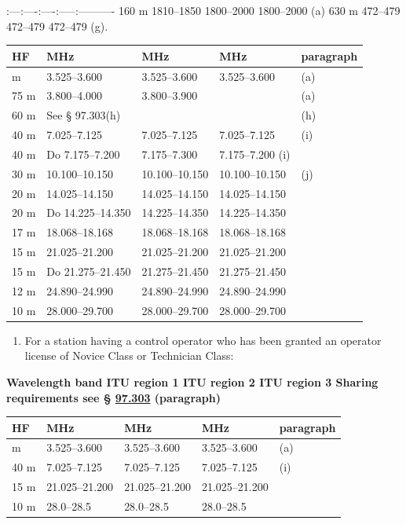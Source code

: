 \documentclass[
  letterpaper,
  DIV=11,
  numbers=noendperiod]{scrreport}
\providecommand{\tightlist}{%
  \setlength{\itemsep}{0pt}\setlength{\parskip}{0pt}}\usepackage{longtable,booktabs,array}
\begin{document}
\textbar:---\textbar:----\textbar:----:-----\textbar:----------\textbar{}
\textbar{} 160 m \textbar{} 1810--1850 \textbar{} 1800--2000 \textbar{}
1800--2000 \textbar{} (a) \textbar{} \textbar{} 630 m \textbar{}
472--479 \textbar{} 472--479 \textbar{} 472--479 \textbar{} (g).
\textbar{}

\begin{longtable}[]{@{}lllll@{}}
\toprule\noalign{}
HF & MHz & MHz & MHz & paragraph \\
\midrule\noalign{}
\endhead
\bottomrule\noalign{}
\endlastfoot
80 m & 3.525--3.600 & 3.525--3.600 & 3.525--3.600 & (a) \\
75 m & 3.800--4.000 & 3.800--3.900 & & (a) \\
60 m & See § 97.303(h) & & & (h) \\
40 m & 7.025--7.125 & 7.025--7.125 & 7.025--7.125 & (i) \\
40 m & Do 7.175--7.200 & 7.175--7.300 & 7.175--7.200 (i) & \\
30 m & 10.100--10.150 & 10.100--10.150 & 10.100--10.150 & (j) \\
20 m & 14.025--14.150 & 14.025--14.150 & 14.025--14.150 & \\
20 m & Do 14.225--14.350 & 14.225--14.350 & 14.225--14.350 & \\
17 m & 18.068--18.168 & 18.068--18.168 & 18.068--18.168 & \\
15 m & 21.025--21.200 & 21.025--21.200 & 21.025--21.200 & \\
15 m & Do 21.275--21.450 & 21.275--21.450 & 21.275--21.450 & \\
12 m & 24.890--24.990 & 24.890--24.990 & 24.890--24.990 & \\
10 m & 28.000--29.700 & 28.000--29.700 & 28.000--29.700 & \\
\end{longtable}

\begin{enumerate}
\def\labelenumi{(\alph{enumi})}
\setcounter{enumi}{4}
\tightlist
\item
  For a station having a control operator who has been granted an
  operator license of Novice Class or Technician Class:
\end{enumerate}

\textbf{Wavelength band ITU region 1 ITU region 2 ITU region 3 Sharing
requirements see § \protect\hyperlink{97.303}{97.303} (paragraph)}

\begin{longtable}[]{@{}lllll@{}}
\toprule\noalign{}
HF & MHz & MHz & MHz & paragraph \\
\midrule\noalign{}
\endhead
\bottomrule\noalign{}
\endlastfoot
80 m & 3.525--3.600 & 3.525--3.600 & 3.525--3.600 & (a) \\
40 m & 7.025--7.125 & 7.025--7.125 & 7.025--7.125 & (i) \\
15 m & 21.025--21.200 & 21.025--21.200 & 21.025--21.200 & \\
10 m & 28.0--28.5 & 28.0--28.5 & 28.0--28.5 & \\
\end{longtable}
\end{document}
